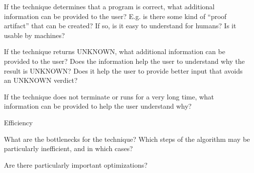 \documentclass[a4paper]{article}
\begin{document}
\begin{minipage}[t]{0.16\linewidth}
\begin{betterlist}
\begin{betterlist}
			\item If the technique determines that a program is correct, what additional information can be provided to the user? E.g. is there some kind of \enquote{proof artifact} that can be created? If so, is it easy to understand for humans? Is it usable by machines?

			\item If the technique returns UNKNOWN, what additional information can be provided to the user? Does the information help the user to understand why the result is UNKNOWN? Does it help the user to provide better input that avoids an UNKNOWN verdict?

			\item If the technique does not terminate or runs for a very long time, what information can be provided to help the user understand why?

		\end{betterlist}
		\item \alert{Efficiency}
		\begin{betterlist}
			\item What are the bottlenecks for the technique? Which steps of the algorithm may be particularly inefficient, and in which cases?

			\item Are there particularly important optimizations?


\end{betterlist}
\end{betterlist}
\end{minipage}
\end{document}
